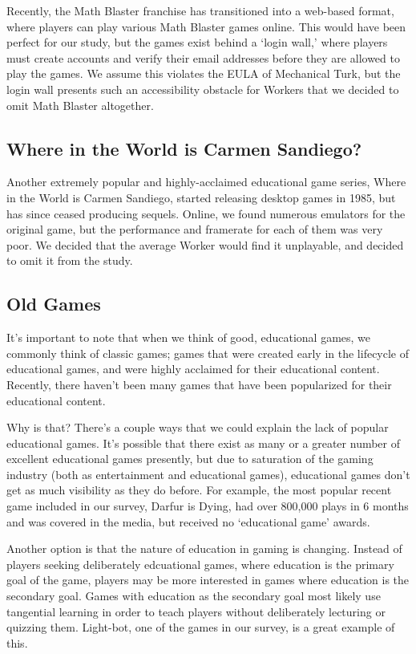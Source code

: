 \documentclass[12pt]{report}
\begin{document}
			Recently, the Math Blaster franchise has transitioned into a web-based format, where players can play various Math Blaster games online. This would have been perfect for our study, but the games exist behind a `login wall,' where players must create accounts and verify their email addresses before they are allowed to play the games. We assume this violates the EULA of Mechanical Turk, but the login wall presents such an accessibility obstacle for Workers that we decided to omit Math Blaster altogether. 

		\subsection{Where in the World is Carmen Sandiego?}
			Another extremely popular and highly-acclaimed educational game series, Where in the World is Carmen Sandiego, started releasing desktop games in 1985, but has since ceased producing sequels. Online, we found numerous emulators for the original game, but the performance and framerate for each of them was very poor. We decided that the average Worker would find it unplayable, and decided to omit it from the study.

		\subsection{Old Games}
			It's important to note that when we think of good, educational games, we commonly think of classic games; games that were created early in the lifecycle of educational games, and were highly acclaimed for their educational content. Recently, there haven't been many games that have been popularized for their educational content.

			Why is that? There's a couple ways that we could explain the lack of popular educational games. It's possible that there exist as many or a greater number of excellent educational games presently, but due to saturation of the gaming industry (both as entertainment and educational games), educational games don't get as much visibility as they do before. For example, the most popular recent game included in our survey, Darfur is Dying, had over 800,000 plays in 6 months and was covered in the media, but received no `educational game' awards.

			Another option is that the nature of education in gaming is changing. Instead of players seeking deliberately edcuational games, where education is the primary goal of the game, players may be more interested in games where education is the secondary goal. Games with education as the secondary goal most likely use tangential learning in order to teach players without deliberately lecturing or quizzing them. Light-bot, one of the games in our survey, is a great example of this.
\end{document}
